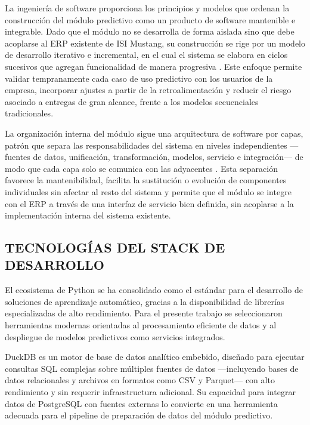 \documentclass{univalle-perfil}
\begin{document}
La ingeniería de software proporciona los principios y modelos que ordenan la construcción del módulo predictivo como un producto de software mantenible e integrable. Dado que el módulo no se desarrolla de forma aislada sino que debe acoplarse al ERP existente de ISI Mustang, su construcción se rige por un modelo de desarrollo iterativo e incremental, en el cual el sistema se elabora en ciclos sucesivos que agregan funcionalidad de manera progresiva \parencite{Sommerville2011}. Este enfoque permite validar tempranamente cada caso de uso predictivo con los usuarios de la empresa, incorporar ajustes a partir de la retroalimentación y reducir el riesgo asociado a entregas de gran alcance, frente a los modelos secuenciales tradicionales.

La organización interna del módulo sigue una arquitectura de software por capas, patrón que separa las responsabilidades del sistema en niveles independientes —fuentes de datos, unificación, transformación, modelos, servicio e integración— de modo que cada capa solo se comunica con las adyacentes \parencite{Bass2012}. Esta separación favorece la mantenibilidad, facilita la sustitución o evolución de componentes individuales sin afectar al resto del sistema y permite que el módulo se integre con el ERP a través de una interfaz de servicio bien definida, sin acoplarse a la implementación interna del sistema existente.

\subsection{TECNOLOGÍAS DEL STACK DE DESARROLLO}

El ecosistema de Python se ha consolidado como el estándar para el desarrollo de soluciones de aprendizaje automático, gracias a la disponibilidad de librerías especializadas de alto rendimiento. Para el presente trabajo se seleccionaron herramientas modernas orientadas al procesamiento eficiente de datos y al despliegue de modelos predictivos como servicios integrados.

DuckDB es un motor de base de datos analítico embebido, diseñado para ejecutar consultas SQL complejas sobre múltiples fuentes de datos —incluyendo bases de datos relacionales y archivos en formatos como CSV y Parquet— con alto rendimiento y sin requerir infraestructura adicional. Su capacidad para integrar datos de PostgreSQL con fuentes externas lo convierte en una herramienta adecuada para el pipeline de preparación de datos del módulo predictivo.
\end{document}

